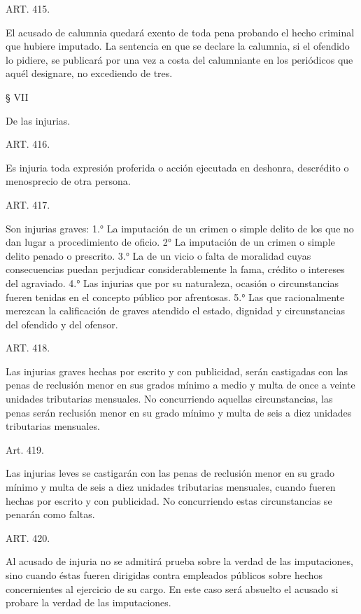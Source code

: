     ART. 415.

    El acusado de calumnia quedará exento de toda pena probando el hecho criminal que hubiere imputado.
    La sentencia en que se declare la calumnia, si el ofendido lo pidiere, se publicará por una vez a costa del calumniante en los periódicos que aquél designare, no excediendo de tres.



    § VII

    De las injurias.


    ART. 416.

    Es injuria toda expresión proferida o acción ejecutada en deshonra, descrédito o menosprecio de otra persona.


    ART. 417.

    Son injurias graves:
    1.° La imputación de un crimen o simple delito de los que no dan lugar a procedimiento de oficio.
    2° La imputación de un crimen o simple delito penado o prescrito.
    3.° La de un vicio o falta de moralidad cuyas consecuencias puedan perjudicar considerablemente la fama, crédito o intereses del agraviado.
    4.° Las injurias que por su naturaleza, ocasión o circunstancias fueren tenidas en el concepto público por afrentosas.
    5.° Las que racionalmente merezcan la calificación de graves atendido el estado, dignidad y circunstancias del ofendido y del ofensor.



    ART. 418.

    Las injurias graves hechas por escrito y con publicidad, serán castigadas con las penas de reclusión menor en sus grados mínimo a medio y multa de once a veinte unidades tributarias mensuales.
    No concurriendo aquellas circunstancias, las penas serán reclusión menor en su grado mínimo y multa de seis a diez unidades tributarias mensuales.






    Art. 419.

    Las injurias leves se castigarán con las penas de reclusión menor en su grado mínimo y multa de seis a diez unidades tributarias mensuales, cuando fueren hechas por escrito y con publicidad. No concurriendo estas circunstancias se penarán como faltas.





    ART. 420.

    Al acusado de injuria no se admitirá prueba sobre la verdad de las imputaciones, sino cuando éstas fueren dirigidas contra empleados públicos sobre hechos concernientes al ejercicio de su cargo.
    En este caso será absuelto el acusado si probare la verdad de las imputaciones.



